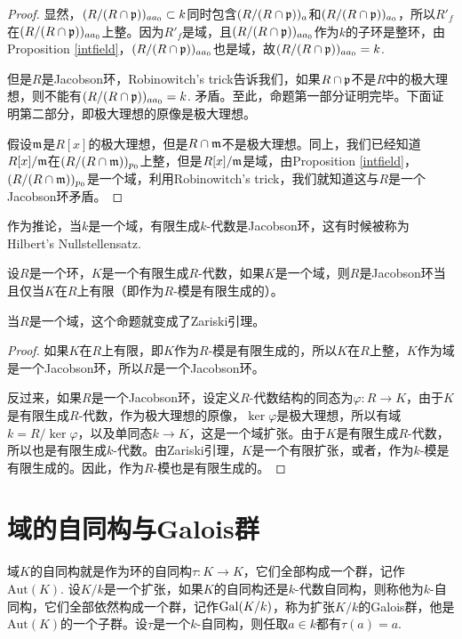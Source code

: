\begin{proof}
显然，$(R/(R\cap \mathfrak{p}))_{aa_0}\subset k$同时包含$(R/(R\cap \mathfrak{p}))_{a}$和$(R/(R\cap \mathfrak{p}))_{a_0}$，所以$R'_f$在$(R/(R\cap \mathfrak{p}))_{aa_0}$上整。因为$R'_f$是域，且$(R/(R\cap \mathfrak{p}))_{aa_0}$作为$k$的子环是整环，由Proposition \ref{intfield}，$(R/(R\cap \mathfrak{p}))_{aa_0}$也是域，故$(R/(R\cap \mathfrak{p}))_{aa_0}=k$.

但是$R$是Jacobson环，Robinowitch's trick告诉我们，如果$R\cap \mathfrak{p}$不是$R$中的极大理想，则不能有$(R/(R\cap \mathfrak{p}))_{aa_0}=k$. 矛盾。至此，命题第一部分证明完毕。下面证明第二部分，即极大理想的原像是极大理想。

假设$\mathfrak{m}$是$R[x]$的极大理想，但是$R\cap \mathfrak{m}$不是极大理想。同上，我们已经知道$R[x]/\mathfrak{m}$在$(R/(R\cap \mathfrak{m}))_{p_0}$上整，但是$R[x]/\mathfrak{m}$是域，由Proposition \ref{intfield}，$(R/(R\cap \mathfrak{m}))_{p_0}$是一个域，利用Robinowitch's trick，我们就知道这与$R$是一个Jacobson环矛盾。\end{proof}

作为推论，当$k$是一个域，有限生成$k$-代数是Jacobson环，这有时候被称为Hilbert's Nullstellensatz.

\begin{pro}
设$R$是一个环，$K$是一个有限生成$R$-代数，如果$K$是一个域，则$R$是Jacobson环当且仅当$K$在$R$上有限（即作为$R$-模是有限生成的）。
\end{pro}

当$R$是一个域，这个命题就变成了Zariski引理。

\begin{proof} 如果$K$在$R$上有限，即$K$作为$R$-模是有限生成的，所以$K$在$R$上整，$K$作为域是一个Jacobson环，所以$R$是一个Jacobson环。

反过来，如果$R$是一个Jacobson环，设定义$R$-代数结构的同态为$\varphi:R\to K$，由于$K$是有限生成$R$-代数，作为极大理想的原像，$\ker\varphi$是极大理想，所以有域$k=R/\ker\varphi$，以及单同态$k\to K$，这是一个域扩张。由于$K$是有限生成$R$-代数，所以也是有限生成$k$-代数。由Zariski引理，$K$是一个有限扩张，或者，作为$k$-模是有限生成的。因此，作为$R$-模也是有限生成的。\end{proof}

\section{域的自同构与Galois群}

\para 域$K$的自同构就是作为环的自同构$\tau:K\to K$，它们全部构成一个群，记作$\mathrm{Aut}(K)$. 设$K/k$是一个扩张，如果$K$的自同构还是$k$-代数自同构，则称他为$k$-自同构，它们全部依然构成一个群，记作$\operatorname{Gal}(K/k)$，称为扩张$K/k$的Galois群，他是$\mathrm{Aut}(K)$的一个子群。设$\tau$是一个$k$-自同构，则任取$a\in k$都有$\tau(a)=a$.


